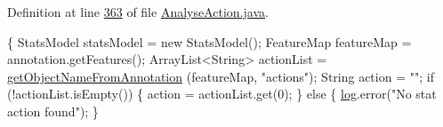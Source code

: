 Definition at line \hyperlink{L363}{363} of file \hyperlink{}{Analyse\-Action.\-java}.


\begin{DoxyCode}
                               \{
        StatsModel statsModel = \textcolor{keyword}{new} StatsModel();
        FeatureMap featureMap = annotation.getFeatures();
        ArrayList<String> actionList = \hyperlink{classcom_1_1poly_1_1nlp_1_1filekommander_1_1file_1_1actions_1_1_analyse_action_a8652e1bba48585a8c416e6e212fe4766}{getObjectNameFromAnnotation}
      (featureMap,
                \textcolor{stringliteral}{"actions"});
        String action = \textcolor{stringliteral}{""};
        \textcolor{keywordflow}{if} (!actionList.isEmpty()) \{
            action = actionList.get(0);
        \} \textcolor{keywordflow}{else} \{
            \hyperlink{classcom_1_1poly_1_1nlp_1_1filekommander_1_1file_1_1actions_1_1_analyse_action_ae99df52b353dd7b0d2014d581fcc8cff}{log}.error(\textcolor{stringliteral}{"No stat action found"});
        \}


\end{DoxyCode}
